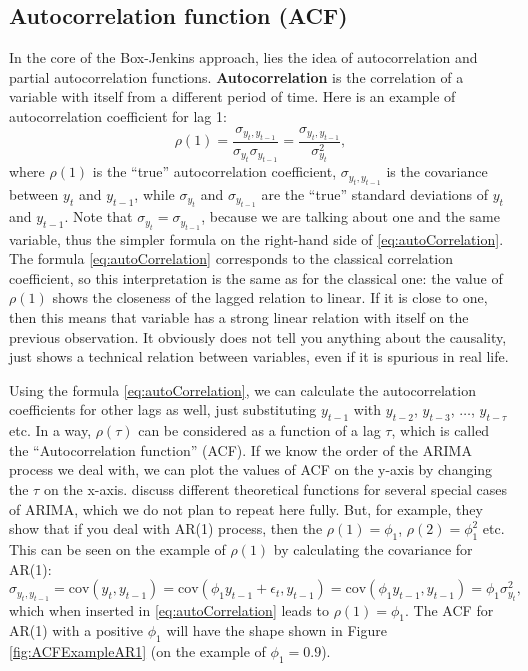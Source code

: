 \documentclass[]{book}
\theoremstyle{definition}
\theoremstyle{definition}
\theoremstyle{definition}
\theoremstyle{definition}
\theoremstyle{remark}
\begin{document}
\hypertarget{ACF}{%
\subsection{Autocorrelation function (ACF)}\label{ACF}}

In the core of the Box-Jenkins approach, lies the idea of autocorrelation and partial autocorrelation functions. \textbf{Autocorrelation} is the correlation \citep[see Section 6.3 of][]{SvetunkovSBA} of a variable with itself from a different period of time. Here is an example of autocorrelation coefficient for lag 1:
\begin{equation}
  \rho(1) = \frac{\sigma_{y_t,y_{t-1}}}{\sigma_{y_t}\sigma_{y_{t-1}}} = \frac{\sigma_{y_t,y_{t-1}}}{\sigma_{y_t}^2},
  \label{eq:autoCorrelation}
\end{equation}
where \(\rho(1)\) is the ``true'' autocorrelation coefficient, \(\sigma_{y_t,y_{t-1}}\) is the covariance between \(y_t\) and \(y_{t-1}\), while \(\sigma_{y_t}\) and \(\sigma_{y_{t-1}}\) are the ``true'' standard deviations of \(y_t\) and \(y_{t-1}\). Note that \(\sigma_{y_t}=\sigma_{y_{t-1}}\), because we are talking about one and the same variable, thus the simpler formula on the right-hand side of \eqref{eq:autoCorrelation}. The formula \eqref{eq:autoCorrelation} corresponds to the classical correlation coefficient, so this interpretation is the same as for the classical one: the value of \(\rho(1)\) shows the closeness of the lagged relation to linear. If it is close to one, then this means that variable has a strong linear relation with itself on the previous observation. It obviously does not tell you anything about the causality, just shows a technical relation between variables, even if it is spurious in real life.

Using the formula \eqref{eq:autoCorrelation}, we can calculate the autocorrelation coefficients for other lags as well, just substituting \(y_{t-1}\) with \(y_{t-2}\), \(y_{t-3}\), \(\dots\), \(y_{t-\tau}\) etc. In a way, \(\rho(\tau)\) can be considered as a function of a lag \(\tau\), which is called the ``Autocorrelation function'' (ACF). If we know the order of the ARIMA process we deal with, we can plot the values of ACF on the y-axis by changing the \(\tau\) on the x-axis. \citet{Box1976} discuss different theoretical functions for several special cases of ARIMA, which we do not plan to repeat here fully. But, for example, they show that if you deal with AR(1) process, then the \(\rho(1)=\phi_1\), \(\rho(2)=\phi_1^2\) etc. This can be seen on the example of \(\rho(1)\) by calculating the covariance for AR(1):
\begin{equation}
  \sigma_{y_t,y_{t-1}} = \mathrm{cov}(y_t,y_{t-1}) = \mathrm{cov}(\phi_1 y_{t-1} + \epsilon_t, y_{t-1}) = \mathrm{cov}(\phi_1 y_{t-1}, y_{t-1}) = \phi_1 \sigma_{y_t}^2 ,
  \label{eq:autoCovarianceAR1}
\end{equation}
which when inserted in \eqref{eq:autoCorrelation} leads to \(\rho(1)=\phi_1\). The ACF for AR(1) with a positive \(\phi_1\) will have the shape shown in Figure \ref{fig:ACFExampleAR1} (on the example of \(\phi_1=0.9\)).
\end{document}
